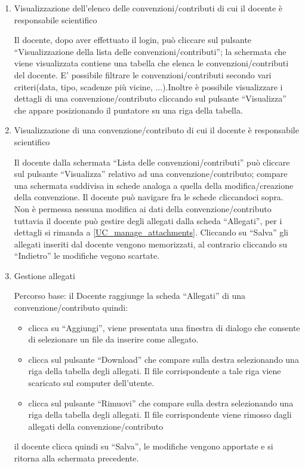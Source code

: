 \begin{enumerate}
\begin{enumerate}
 
 \item Visualizzazione dell'elenco delle convenzioni/contributi di cui il docente è responsabile scientifico\\ \label{UC_view_own_contract_list}
 
 Il docente, dopo aver effettuato il login, può cliccare sul pulsante ``Visualizzazione della lista delle convenzioni/contributi''; la schermata
 che viene visualizzata contiene una tabella che elenca le convenzioni/contributi del docente. E' possibile filtrare le convenzioni/contributi
 secondo vari criteri(data, tipo, scadenze più vicine, ...).Inoltre è possibile visualizzare i dettagli di una convenzione/contributo cliccando sul
 pulsante ``Visualizza'' che appare posizionando il puntatore su una riga della tabella.
 
 \item Visualizzazione di una convenzione/contributo di cui il docente è responsabile scientifico\\ \label{UC_view_own_contract}
 
 Il docente dalla schermata ``Lista delle convenzioni/contributi'' può cliccare sul pulsante ``Visualizza'' relativo ad una convenzione/contributo; compare una schermata suddivisa in schede analoga a quella della modifica/creazione
 della convenzione. Il docente può navigare fra le schede cliccandoci sopra. Non è permessa nessuna modifica ai dati della convenzione/contributo tuttavia il docente può gestire degli allegati dalla scheda ``Allegati'', per i dettagli
 si rimanda a \ref{UC_manage_attachments}. Cliccando su ``Salva''
 gli allegati inseriti dal docente vengono memorizzati, al contrario cliccando su ``Indietro'' le modifiche vegono scartate.
 
 \item Gestione allegati\\ \label{UC_manage_attachments}
  
 Percorso base:
 il Docente raggiunge la scheda ``Allegati'' di una convenzione/contributo quindi:
  \begin{itemize}
   \item clicca su ``Aggiungi'', viene presentata una finestra di dialogo che consente di selezionare un file da inserire come allegato.
   \item clicca sul pulsante ``Download'' che compare sulla destra selezionando una riga della tabella degli allegati. Il file corrispondente a tale riga viene scaricato sul computer dell'utente.
   \item clicca sul pulsante ``Rimuovi'' che compare sulla destra selezionando una riga della tabella degli allegati. Il file corrispondente viene rimosso dagli allegati della convenzione/contributo
  \end{itemize}
 il docente clicca quindi su ``Salva'', le modifiche vengono apportate e si ritorna alla schermata precedente.
 

\end{enumerate}
\end{enumerate}
